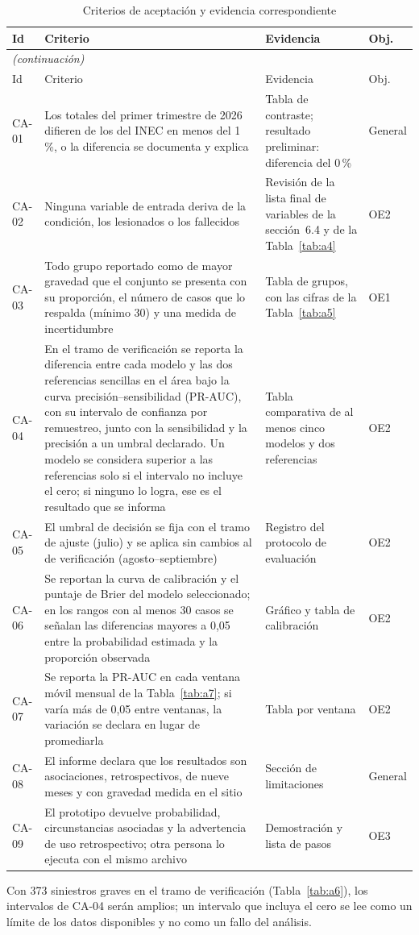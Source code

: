 \begin{longtable}{p{1.2cm}p{7.9cm}p{3.4cm}p{1.4cm}}
\caption{Criterios de aceptación y evidencia correspondiente}
\label{tab:criterios}\\
\toprule
Id & Criterio & Evidencia & Obj. \\
\midrule
\endfirsthead
\multicolumn{4}{l}{\footnotesize\itshape (continuación)}\\
\toprule
Id & Criterio & Evidencia & Obj. \\
\midrule
\endhead
\bottomrule
\endfoot
CA-01 & Los totales del primer trimestre de 2026 difieren de los del INEC en menos del 1\,\%, o la diferencia se documenta y explica & Tabla de contraste; resultado preliminar: diferencia del 0\,\% & General \\
CA-02 & Ninguna variable de entrada deriva de la condición, los lesionados o los fallecidos & Revisión de la lista final de variables de la sección~6.4 y de la Tabla~\ref{tab:a4} & OE2 \\
CA-03 & Todo grupo reportado como de mayor gravedad que el conjunto se presenta con su proporción, el número de casos que lo respalda (mínimo 30) y una medida de incertidumbre & Tabla de grupos, con las cifras de la Tabla~\ref{tab:a5} & OE1 \\
CA-04 & En el tramo de verificación se reporta la diferencia entre cada modelo y las dos referencias sencillas en el área bajo la curva precisión--sensibilidad (PR-AUC), con su intervalo de confianza por remuestreo, junto con la sensibilidad y la precisión a un umbral declarado. Un modelo se considera superior a las referencias solo si el intervalo no incluye el cero; si ninguno lo logra, ese es el resultado que se informa & Tabla comparativa de al menos cinco modelos y dos referencias & OE2 \\
CA-05 & El umbral de decisión se fija con el tramo de ajuste (julio) y se aplica sin cambios al de verificación (agosto--septiembre) & Registro del protocolo de evaluación & OE2 \\
CA-06 & Se reportan la curva de calibración y el puntaje de Brier del modelo seleccionado; en los rangos con al menos 30 casos se señalan las diferencias mayores a 0,05 entre la probabilidad estimada y la proporción observada & Gráfico y tabla de calibración & OE2 \\
CA-07 & Se reporta la PR-AUC en cada ventana móvil mensual de la Tabla~\ref{tab:a7}; si varía más de 0,05 entre ventanas, la variación se declara en lugar de promediarla & Tabla por ventana & OE2 \\
CA-08 & El informe declara que los resultados son asociaciones, retrospectivos, de nueve meses y con gravedad medida en el sitio & Sección de limitaciones & General \\
CA-09 & El prototipo devuelve probabilidad, circunstancias asociadas y la advertencia de uso retrospectivo; otra persona lo ejecuta con el mismo archivo & Demostración y lista de pasos & OE3 \\
\end{longtable}

Con 373 siniestros graves en el tramo de verificación (Tabla~\ref{tab:a6}), los intervalos de CA-04 serán amplios; un intervalo que incluya el cero se lee como un límite de los datos disponibles y no como un fallo del análisis.
